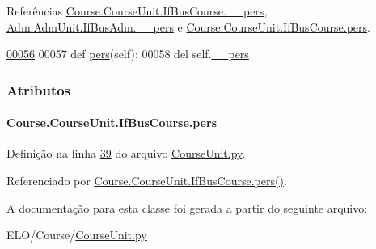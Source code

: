 Referências \hyperlink{CourseUnit_8py_source_l00051}{Course.\-Course\-Unit.\-If\-Bus\-Course.\-\_\-\-\_\-pers}, \hyperlink{AdmUnit_8py_source_l00061}{Adm.\-Adm\-Unit.\-If\-Bus\-Adm.\-\_\-\-\_\-pers} e \hyperlink{classCourse_1_1CourseUnit_1_1IfBusCourse_ab926ae8fb127b7697e2b63025df09a78}{Course.\-Course\-Unit.\-If\-Bus\-Course.\-pers}.


\begin{DoxyCode}
\hypertarget{classCourse_1_1CourseUnit_1_1IfBusCourse_l00056}{}\hyperlink{classCourse_1_1CourseUnit_1_1IfBusCourse_adf5702dec1a99bbb31936b7f1d425a40}{00056} 
00057     \textcolor{keyword}{def }\hyperlink{classCourse_1_1CourseUnit_1_1IfBusCourse_ab926ae8fb127b7697e2b63025df09a78}{pers}(self):
00058         del self.\hyperlink{classCourse_1_1CourseUnit_1_1IfBusCourse_a4d7664514162640c28bda49579b46ef0}{\_\_pers}

\end{DoxyCode}


\subsubsection{Atributos}
\hypertarget{classCourse_1_1CourseUnit_1_1IfBusCourse_ab926ae8fb127b7697e2b63025df09a78}{
\paragraph[{pers}]{\setlength{\rightskip}{0pt plus 5cm}Course.\-Course\-Unit.\-If\-Bus\-Course.\-pers}}\label{classCourse_1_1CourseUnit_1_1IfBusCourse_ab926ae8fb127b7697e2b63025df09a78}


Definição na linha \hyperlink{CourseUnit_8py_source_l00039}{39} do arquivo \hyperlink{CourseUnit_8py_source}{Course\-Unit.\-py}.



Referenciado por \hyperlink{classCourse_1_1CourseUnit_1_1IfBusCourse_adf5702dec1a99bbb31936b7f1d425a40}{Course.\-Course\-Unit.\-If\-Bus\-Course.\-pers()}.



A documentação para esta classe foi gerada a partir do seguinte arquivo\-:\begin{DoxyCompactItemize}
\item 
E\-L\-O/\-Course/\hyperlink{CourseUnit_8py}{Course\-Unit.\-py}\end{DoxyCompactItemize}
